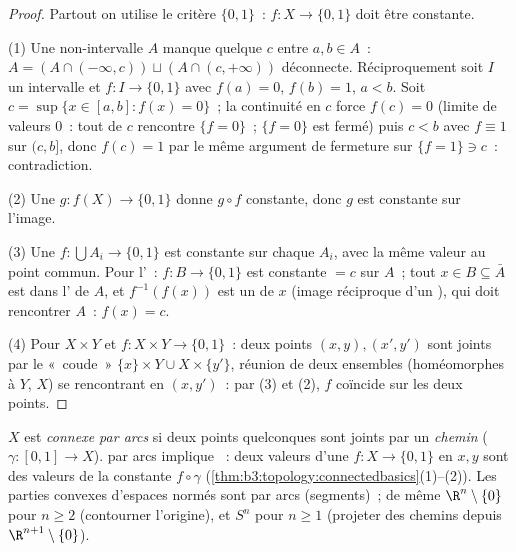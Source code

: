\begin{proof}
Partout on utilise le critère $\{0,1\}$~: $f \colon X \to
\{0,1\}$  doit être constante.

(1) Une non-intervalle $A$ manque quelque $c$ entre $a, b \in
A$~: $A = (A \cap (-\infty, c)) \sqcup (A \cap (c, +\infty))$
déconnecte. Réciproquement soit $I$ un intervalle et $f \colon
I \to \{0,1\}$  avec $f(a) = 0$, $f(b) = 1$, $a < b$.
Soit $c = \sup\{x \in [a,b] : f(x) = 0\}$~; la continuité en
$c$ force $f(c) = 0$ (limite de valeurs $0$~: tout  de
$c$ rencontre $\{f = 0\}$~; $\{f=0\}$ est fermé) puis $c < b$
avec $f \equiv 1$ sur $(c, b]$, donc $f(c) = 1$ par le même
argument de fermeture sur $\{f = 1\} \ni c$~: contradiction.

(2) Une $g \colon f(X) \to \{0,1\}$  donne $g \circ f$
constante, donc $g$ est constante sur l'image.

(3) Une $f\colon \bigcup A_i \to \{0,1\}$  est
constante sur chaque $A_i$, avec la même valeur au point
commun. Pour l'~: $f \colon B \to \{0,1\}$ est
constante $= c$ sur $A$~; tout $x \in B \subseteq \bar A$ est
dans l' de $A$, et $f^{-1}(f(x))$ est un  de
$x$ (image réciproque d'un ), qui doit rencontrer $A$~:
$f(x) = c$.

(4) Pour $X \times Y$ et $f\colon X\times Y \to \{0,1\}$~: deux
points $(x,y), (x',y')$ sont joints par le «~coude~»
$\{x\}\times Y \cup X \times \{y'\}$, réunion de deux
ensembles  (homéomorphes à $Y$, $X$) se rencontrant en
$(x, y')$~: par (3) et (2), $f$ coïncide sur les deux points.
\end{proof}

\begin{definition}\label{def:b3:topology:pathconnected}
$X$ est \emph{connexe par arcs}
si deux points quelconques sont joints par un \emph{chemin}
( $\gamma \colon [0,1] \to X$).  par
arcs implique ~: deux valeurs d'une $f \colon X \to
\{0,1\}$  en $x, y$ sont des valeurs de la constante
$f\circ\gamma$
(\cref{thm:b3:topology:connectedbasics}(1)--(2)). Les parties
convexes d'espaces normés sont  par arcs
(segments)~; de même $\R^n \setminus \{0\}$ pour $n \geq 2$
(contourner l'origine), et $S^n$ pour $n \geq 1$ (projeter des
chemins depuis $\R^{n+1}\setminus \{0\}$).
\end{definition}

